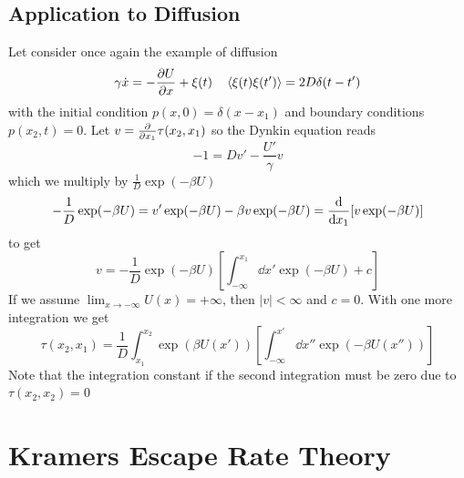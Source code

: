 \documentclass{/home/ben/Templates/notebook}
\begin{document}
	\subsection*{Application to Diffusion}
	
	Let consider once again the example of diffusion
	\begin{equation}
	\gamma \dot{x} = - \pdv{U}{x} + \xi(t) \quad \expval{\xi(t)\xi(t')} = 2D \delta(t-t')
	\end{equation}
	with the initial condition $p(x,0) = \delta(x-x_1)$ and boundary conditions $p(x_2,t) = 0$. Let $v = \pdv{x_1} \tau(x_2,x_1)$ so the Dynkin equation reads
	\begin{equation}
	-1 = D v' - \frac{U'}{\gamma}v
	\end{equation}
	which we multiply by $\frac{1}{D}\exp(-\beta U)$
	\begin{equation}
	-\frac{1}{D}\exp(-\beta U) = v'\exp(-\beta U) - \beta v \exp(-\beta U) = \dv{x_1}[v \exp(-\beta U)]
	\end{equation}
	to get
	\begin{equation}
	v = -\frac{1}{D}\exp(-\beta U) \left[ \int_{-\infty}^{x_1} \dd{x'} \exp(-\beta U) + c \right]
	\end{equation}
	If we assume $\lim_{x\to -\infty} U(x) = +\infty$, then $|v| < \infty$ and $c = 0$. With one more integration we get
	\begin{equation}
	\tau(x_2,x_1) = \frac{1}{D} \int_{x_1}^{x_2} \exp(\beta U(x')) \left[ \int_{-\infty}^{x'} \dd{x''} \exp(-\beta U(x'')) \right]
	\end{equation}
	Note that the integration constant if the second integration must be zero due to $\tau(x_2,x_2) = 0$
	
	\section{Kramers Escape Rate Theory}
	
\end{document}
